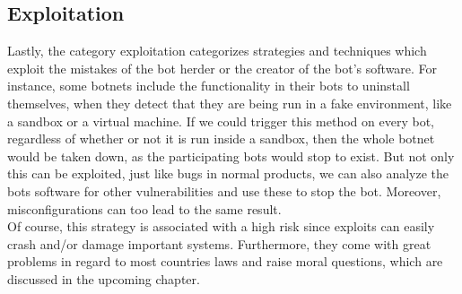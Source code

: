 \documentclass[10pt, a4paper, twocolumn]{article} %
\begin{document}
\subsection{Exploitation}\label{exploit}
Lastly, the category exploitation categorizes strategies and techniques which exploit the mistakes of the bot herder or the creator of the bot's software. For instance, some botnets include the functionality in their bots to uninstall themselves, when they detect that they are being run in a fake environment, like a sandbox or a virtual machine. If we could trigger this method on every bot, regardless of whether or not it is run inside a sandbox, then the whole botnet would be taken down, as the participating bots would stop to exist. But not only this can be exploited, just like bugs in normal products, we can also analyze the bots software for other vulnerabilities and use these to stop the bot. Moreover, misconfigurations can too lead to the same result.\\

Of course, this strategy is associated with a high risk since exploits can easily crash and/or damage important systems. Furthermore, they come with great problems in regard to most countries laws and raise moral questions, which are discussed in the upcoming chapter. 
\end{document}
